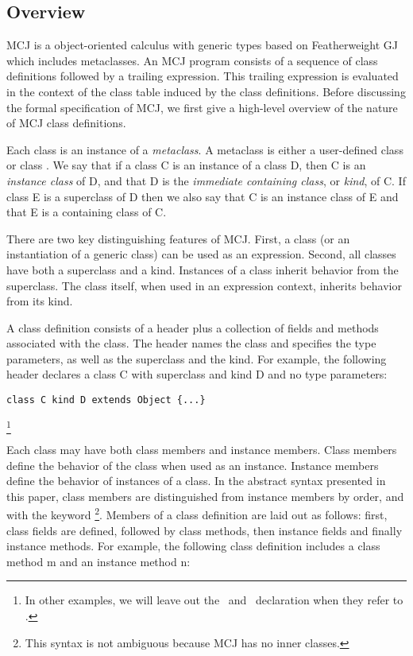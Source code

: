\documentclass{acm-sigplan}
\begin{document}
\subsection{Overview}

\label{MCJintro}

MCJ is a object-oriented calculus with generic types based on
Featherweight GJ which includes metaclasses. An MCJ program consists of
a sequence of class definitions followed by a trailing
expression. This trailing expression is evaluated in the context of
the class table induced by the class definitions.  Before discussing
the formal specification of MCJ, we first give a high-level overview
of the nature of MCJ class definitions.

Each class is an instance of a \emph{metaclass}.  A metaclass is
either a user-defined class or class {}.  We say that if a
class {\txt C} is an instance of a class {\txt D}, then {\txt C} is an
\emph{instance class} of {\txt D}, and that {\txt D} is the
\emph{immediate containing class}, or \emph{kind}, of {\txt C}.  If
class {\txt E} is a superclass of {\txt D} then we also say that {\txt
C} is an instance class of {\txt E} and that {\txt E} is a containing
class of {\txt C}.

There are two key distinguishing features of MCJ. First, a class (or
an instantiation of a generic class) can be used as an expression.
Second, all classes have both a superclass and a kind. Instances of a
class inherit behavior from the superclass. The class itself, when
used in an expression context, inherits behavior from its kind.

A class definition consists of a header plus a collection of fields
and methods associated with the class.  The header names the class and
specifies the type parameters, as well as the superclass and the kind.
For example, the following header declares a class {\txt C} with
superclass {} and kind {\txt D} and no type parameters:

\begin{verbatim}
class C kind D extends Object {...}
\end{verbatim}
\footnote{In other examples, we will leave out the \kind\ and \extends\
declaration when they refer to \Object.}

Each class may have both class members and instance members. Class
members define the behavior of the class when used as an
instance. Instance members define the behavior of instances of a
class.  In the abstract syntax presented in this paper, class members
are distinguished from instance members by order, and with the keyword
\class \footnote{This syntax is not ambiguous because MCJ has no
inner classes.}.  Members of a class definition are laid out as
follows: first, class fields are defined, followed by class methods,
then instance fields and finally instance methods.  For example, the
following class definition includes a class method {\txt m} and an
instance method {\txt n}:
\end{document}
